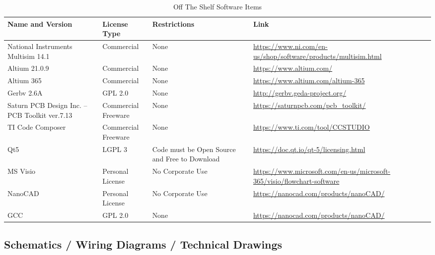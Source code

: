 \documentclass[12pt]{article}
\begin{document}
\begin{table}[h!]
\centering
\caption{Off The Shelf Software Items}
\begin{tabular}{ | l | l | l | l | }
\hline
Name and Version & License Type & Restrictions & Link\\
\hline
\parbox{0.2\linewidth}{\raggedright  National Instruments Multisim 14.1} & Commercial & None & \parbox{0.3\linewidth}{\raggedright  \url{https://www.ni.com/en-us/shop/software/products/multisim.html}} \\
\hline
Altium 21.0.9 & Commercial & None & \parbox{0.3\linewidth}{\raggedright \url{https://www.altium.com/}}\\
\hline
Altium 365 & Commercial & None & \parbox{0.3\linewidth}{\raggedright \url{https://www.altium.com/altium-365}} \\
\hline
Gerbv 2.6A & GPL 2.0 & None & \parbox{0.3\linewidth}{\raggedright \url{http://gerbv.geda-project.org/}} \\
\hline
\parbox{0.2\linewidth}{\raggedright  Saturn PCB Design Inc. – PCB Toolkit ver.7.13} & \parbox{0.2\linewidth}{\raggedright  Commercial \\Freeware} & None & \parbox{0.3\linewidth}{\raggedright \url{ https://saturnpcb.com/pcb\_toolkit/}} \\
\hline
TI Code Composer & \parbox{0.2\linewidth}{\raggedright  Commercial \\Freeware} & None & \parbox{0.3\linewidth}{\raggedright \url{https://www.ti.com/tool/CCSTUDIO}} \\
\hline
Qt5 & LGPL 3 & \parbox{0.2\linewidth}{\raggedright Code must be Open Source and Free to Download}  & \parbox{0.3\linewidth}{\raggedright \url{https://doc.qt.io/qt-5/licensing.html}}\\
\hline
MS Visio & Personal License & No Corporate Use & \parbox{0.3\linewidth}{\raggedright  \url{https://www.microsoft.com/en-us/microsoft-365/visio/flowchart-software}} \\
\hline
NanoCAD & Personal License & No Corporate Use & \parbox{0.3\linewidth}{\raggedright \url{https://nanocad.com/products/nanoCAD/}} \\
\hline
GCC  & GPL 2.0 & None & \parbox{0.3\linewidth}{\raggedright \url{https://nanocad.com/products/nanoCAD/}} \\
\hline
\end{tabular}
\end{table}

\hfill
\pagebreak
\hfill

\subsection{Schematics / Wiring Diagrams / Technical Drawings}
\end{document}
